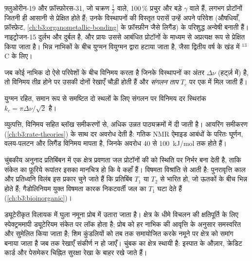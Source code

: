 फ़्लुओरीन-19 और फ़ॉस्फ़ोरस-31, जो चक्रण $\frac12$ वाले, 100\,\% प्रचुर और बड़े
$\gamma$ वाले हैं, लगभग प्रोटॉनों जितनी ही आसानी से प्रेक्षित होते हैं; उनके विस्थापनों की विस्तृत परासें
उन्हें अपने परिवेश (औषधियाँ, फ़ॉस्फ़ेट, \cref{ch:b3:organometallic-bonding} के फ़ॉस्फ़ीन जैसे
लिगैंड) के परिशुद्ध अन्वेषी बनाती हैं। नाइट्रोजन-15 दुर्लभ और
दुर्बल है, और प्रायः उससे आबंधित प्रोटॉनों के माध्यम से अप्रत्यक्ष रूप से प्रेक्षित किया जाता है।
भिन्न नाभिकों के बीच युग्मन वियुग्मन द्वारा हटाया जाता है, जैसा द्वितीय वर्ष के खंड में
${}^{13}$C के लिए।

\begin{definition}[संगलन ताप]\label{def:b3:advanced-nmr:coalescence}
जब कोई नाभिक दो ऐसे परिवेशों के बीच विनिमय करता है जिनके विस्थापनों का अंतर
$\Delta\nu$ (हर्ट्ज़ में) है, तो विनिमय तीव्र होने पर उसकी दोनों रेखाएँ चौड़ी होती हैं और
\emph{संगलन ताप}
$T_c$ पर एक में मिल जाती हैं।
\end{definition}

\begin{proposition}[संगलन पर दर]\label{prop:b3:advanced-nmr:coalescence}
युग्मन रहित, समान रूप से समष्टित दो स्थलों के लिए संगलन पर विनिमय दर स्थिरांक
$k_c = \pi\Delta\nu/\sqrt2$ है।
\end{proposition}
\admitted

व्युत्पत्ति, विनिमय सहित ब्लॉख समीकरणों से, अधिक उन्नत पाठ्यक्रमों में
दी जाती है। आयरिंग समीकरण (\cref{ch:b3:rate-theories}) के साथ दर
अवरोध देती है: गतिक NMR ऐमाइड आबंधों के परितः घूर्णन, वलय-पलटन
और लिगैंड विनिमय मापता है, जिनके अवरोध 40 से \qty{100}{kJ/mol} तक होते हैं।

\begin{example}[एक MRI प्रतिबिंब]\label{ex:b3:advanced-nmr:mri}
चुंबकीय अनुनाद प्रतिबिंबन में एक क्षेत्र प्रवणता जल प्रोटॉनों की  को
स्थिति पर निर्भर बना देती है, ताकि संकेत का फ़ूरिये रूपांतर इसका
मानचित्र हो कि वे कहाँ हैं। विषमता विश्रांति से आती है:
पुनरावृत्ति काल और प्रतिध्वनि विलंब इस प्रकार चुने जाते हैं कि प्रतिबिंब $T_1$ या
$T_2$ से भारित हो, जो ऊतकों के बीच भिन्न होते हैं; गैडोलिनियम युक्त विषमता कारक
निकटवर्ती जल का $T_1$ घटा देते हैं (\cref{ch:b3:bioinorganic})।
\end{example}

\begin{inthelab}
ड्यूटेरीकृत विलायक में घुला नमूना प्रोब में उतारा जाता है।
क्षेत्र के धीमे विचलन की क्षतिपूर्ति के लिए स्पेक्ट्रममापी ड्यूटेरियम संकेत पर लॉक होता है;
प्रोब को हर नाभिक की आवृत्ति के अनुसार समस्वरित और सुमेलित किया जाता है;
शिम कुंडलियों को तब तक समायोजित करके नमूने पर क्षेत्र को समांग बनाया जाता है
जब तक रेखाएँ संकीर्ण न हो जाएँ। चुंबक का क्षेत्र स्थायी है: इस्पात के औज़ार,
क्रेडिट कार्ड और पेसमेकर चिह्नित सुरक्षा रेखा के बाहर रखे जाते हैं।
\end{inthelab}

